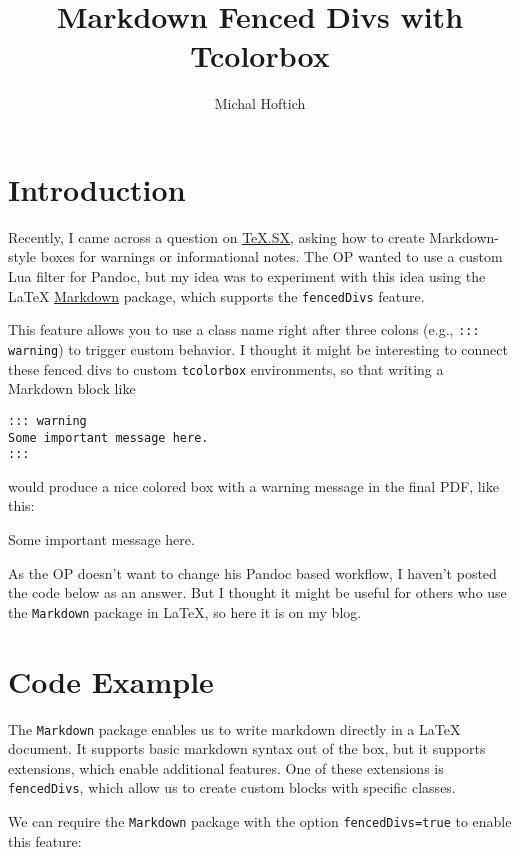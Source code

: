 \documentclass[]{article}
\title{Markdown Fenced Divs with Tcolorbox}
\author{Michal Hoftich}
\begin{document}
\maketitle

\section*{Introduction}

Recently, I came across a question on \href{https://tex.stackexchange.com/q/752194/2891}{TeX.SX}, asking how to create Markdown-style boxes for warnings or informational notes.  
The OP wanted to use a custom Lua filter for Pandoc, but my idea was to
experiment with this idea using the \LaTeX{} \href{https://ctan.org/pkg/markdown?lang=en}{Markdown} package, which
supports the \texttt{fencedDivs} feature.  

This feature allows you to use a class name right after three colons (e.g., \texttt{::: warning}) to trigger custom behavior.  
I thought it might be interesting to connect these fenced divs to custom \texttt{tcolorbox} environments, so that  
writing a Markdown block like

\begin{verbatim}
::: warning
Some important message here.
:::
\end{verbatim}

would produce a nice colored box with a warning message in the final PDF, like this:

\begin{warning}
Some important message here.
\end{warning}


As the OP doesn't want to change his Pandoc based workflow, I haven't posted
the code below as an answer. But I thought it might be useful for others who
use the \texttt{Markdown} package in \LaTeX{}, so here it is on my blog.


\section*{Code Example}

The \texttt{Markdown} package enables us to write markdown directly in a \LaTeX{} document. 
It supports basic markdown syntax out of the box, but it supports extensions, which  
enable additional features. One of these extensions is \Verb|fencedDivs|, 
which allow us to create custom blocks with specific classes. 

We can require the \texttt{Markdown} package with the option \texttt{fencedDivs=true} to enable this feature:
\end{document}
